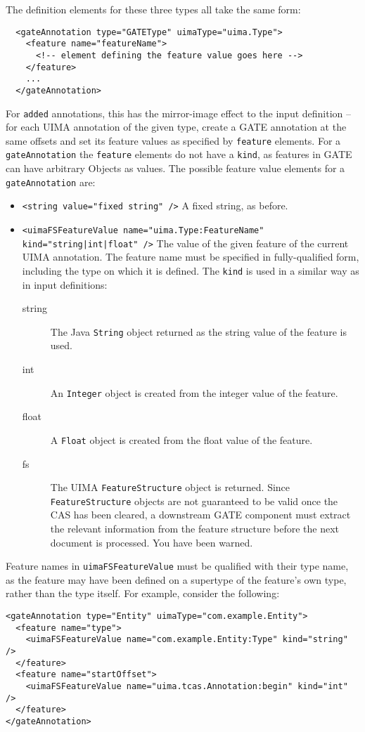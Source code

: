 The definition elements for these three types all take the same form:
\begin{small}
\begin{verbatim}
  <gateAnnotation type="GATEType" uimaType="uima.Type">
    <feature name="featureName">
      <!-- element defining the feature value goes here -->
    </feature>
    ...
  </gateAnnotation>
\end{verbatim}
\end{small}
%
For \texttt{added} annotations, this has the mirror-image effect to the input
definition -- for each UIMA annotation of the given type, create a GATE
annotation at the same offsets and set its feature values as specified by
\texttt{feature} elements.  For a \texttt{gateAnnotation} the \texttt{feature}
elements do not have a \texttt{kind}, as features in GATE can have arbitrary
Objects as values.  The possible feature value elements for a
\texttt{gateAnnotation} are:
\begin{itemize}
\item \verb|<string value="fixed string" />| A fixed string, as before.
\item \verb'<uimaFSFeatureValue name="uima.Type:FeatureName" kind="string|int|float" />'
The value of the given feature of the current UIMA annotation.  The feature
name must be specified in fully-qualified form, including the type on which it
is defined.  The \texttt{kind} is used in a similar way as in input definitions:
  \begin{description}
  \item[string] The Java \texttt{String} object returned as the string value of
  the feature is used.
  \item[int] An \texttt{Integer} object is created from the integer value of
  the feature.
  \item[float] A \texttt{Float} object is created from the float value of the
  feature.
  \item[fs] The UIMA \texttt{FeatureStructure} object is returned.  Since
  \texttt{FeatureStructure} objects are not guaranteed to be valid once the CAS
  has been cleared, a downstream GATE component must extract the relevant
  information from the feature structure before the next document is processed.
  You have been warned.
  \end{description}
\end{itemize}
%
Feature names in \texttt{uimaFSFeatureValue} must be qualified with their type
name, as the feature may have been defined on a supertype of the feature's own
type, rather than the type itself.  For example, consider the following:
\begin{small}
\begin{verbatim}
<gateAnnotation type="Entity" uimaType="com.example.Entity">
  <feature name="type">
    <uimaFSFeatureValue name="com.example.Entity:Type" kind="string" />
  </feature>
  <feature name="startOffset">
    <uimaFSFeatureValue name="uima.tcas.Annotation:begin" kind="int" />
  </feature>
</gateAnnotation>
\end{verbatim}
\end{small}

